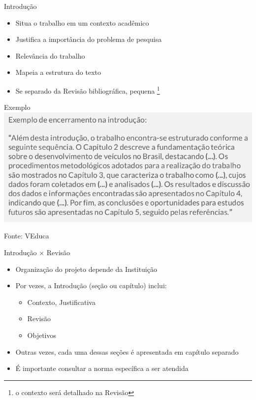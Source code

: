 \documentclass{beamer}
\begin{document}
\begin{frame}{Introdução}
  \begin{itemize}
  \item Situa o trabalho em um contexto acadêmico
  \item Justifica a importância do problema de pesquisa
  \item Relevância do trabalho
  \item Mapeia a estrutura do texto
  \item Se separado da Revisão bibliográfica, pequena \footnote{o
      contexto será detalhado na Revisão}
  \end{itemize}
\end{frame}

\begin{frame}{Exemplo}
  \includegraphics[width=\textwidth]{ProjetoI/exemplo-introducao}

  Fonte: VEduca
\end{frame}

\begin{frame}{Introdução $\times$ Revisão}
  \begin{itemize}
  \item Organização do projeto depende da Instituição
  \item Por vezes, a Introdução (seção ou capítulo) inclui:
    \begin{itemize}
    \item<2-> Contexto, Justificativa
    \item<2-> Revisão
    \item<2-> Objetivos
    \end{itemize}
  \item Outras vezes, cada uma dessas seções é apresentada em capítulo
    separado
  \item É importante \alert{consultar} a norma \alert{específica} a
    ser atendida
  \end{itemize}
\end{frame}
\end{document}
